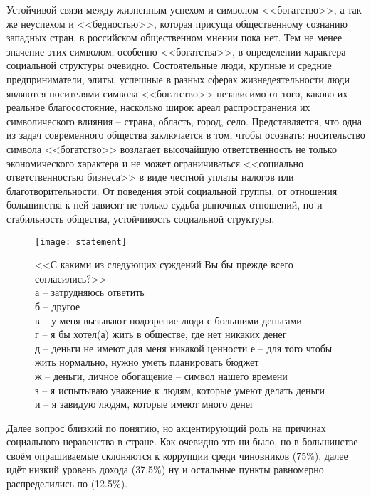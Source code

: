 Устойчивой связи между жизненным успехом и символом <<богатство>>, а так же 
неуспехом и <<бедностью>>, которая присуща общественному сознанию западных 
стран, в российском общественном мнении пока нет. Тем не менее значение этих 
символом, особенно <<богатства>>, в определении характера социальной структуры 
очевидно. Состоятельные люди, крупные и средние предприниматели, элиты, 
успешные в разных сферах жизнедеятельности люди являются носителями символа 
<<богатство>> независимо от того, каково их реальное благосостояние, насколько 
широк ареал распространения их символического влияния -- страна, область, 
город, село. Представляется, что одна из задач современного общества 
заключается в том, чтобы осознать: носительство символа <<богатство>> 
возлагает высочайшую ответственность не только экономического характера и не 
может ограничиваться <<социально ответственностью бизнеса>> в виде честной 
уплаты налогов или благотворительности. От поведения этой социальной группы, 
от отношения большинства к ней зависят не только судьба рыночных отношений, 
но и стабильность общества, устойчивость социальной структуры. 

\begin{figure}[h]
    \centering
    \texttt{[image: statement]} \\
    \caption{<<С какими из следующих суждений Вы бы прежде всего согласились?>> 
        \\
        а -- затрудняюсь ответить\\
        б -- другое \\
        в -- у меня вызывают подозрение люди с большими деньгами \\
        г -- я бы хотел(а) жить в обществе, где нет никаких денег \\
        д -- деньги не имеют для меня никакой ценности
        е -- для того чтобы жить нормально, нужно уметь планировать бюджет \\
        ж -- деньги, личное обогащение -- символ нашего времени \\
        з -- я испытываю уважение к людям, которые умеют делать деньги \\
        и -- я завидую людям, которые имеют много денег \\
    }
\end{figure}

Далее вопрос близкий по понятию, но акцентирующий роль на причинах социального 
неравенства в стране. Как очевидно это ни было, но в большинстве своём 
опрашиваемые склоняются к коррупции среди чиновников (75\%), далее идёт 
низкий уровень дохода (37.5\%) ну и остальные пункты равномерно распределились 
по (12.5\%).

